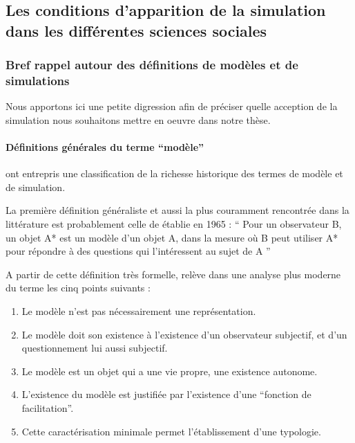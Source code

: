 
\subsection{Les conditions d'apparition de la simulation dans les différentes sciences sociales }
\label{sec:apparition_simu_science_sociales}

\subsubsection{Bref rappel autour des définitions de modèles et de simulations}
\label{ssec:rapell_termes_generiques}

Nous apportons ici une petite digression afin de préciser quelle acception de la simulation nous souhaitons mettre en oeuvre dans notre thèse.

\paragraph{Définitions générales du terme \enquote{modèle}}

\textcite{Varenne2013} ont entrepris une classification de la richesse historique des termes de modèle et de simulation.

La première définition généraliste et aussi la plus couramment rencontrée dans la littérature est probablement celle de \textcite{Minsky1965} établie en 1965 : \enquote{ Pour un observateur B, un objet A* est un modèle d’un objet A, dans la mesure où B peut utiliser A* pour répondre à des questions qui l’intéressent au sujet de A } \autocites{Varenne2008}[15]{Varenne2013b}

A partir de cette définition très formelle, \textcite{Varenne2008} relève dans une analyse plus moderne du terme les cinq points suivants :
\begin{enumerate}
  \item Le modèle n'est pas nécessairement une représentation.
  \item Le modèle doit son existence à l'existence d'un observateur subjectif, et d'un questionnement lui aussi subjectif.
  \item Le modèle est un objet qui a une vie propre, une existence autonome.
  \item L'existence du modèle est justifiée par l'existence d'une \enquote{fonction de facilitation}.
  \item Cette caractérisation minimale permet l'établissement d'une typologie.
\end{enumerate}

